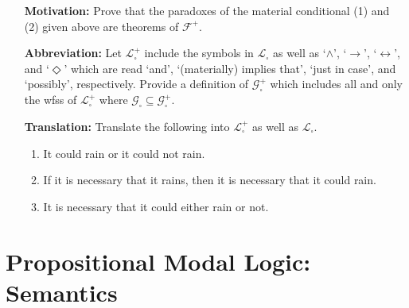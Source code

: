\documentclass[a4paper, 11pt]{article} %
\renewcommand{\L}[0]{\mathcal{L}}
\begin{document}
\begin{enumerate}[leftmargin=1.2in,labelsep=.15in] 
\item[\bf Motivation:] Prove that the paradoxes of the material conditional (1) and (2) given above are theorems of $\mathcal{F}^+$.
\item[\bf Abbreviation:] Let $\L_\square^+$ include the symbols in $\L_\square$ as well as `$\wedge$', `$\rightarrow$', `$\leftrightarrow$', and `$\Diamond$' which are read `and', `(materially) implies that', `just in case', and `possibly', respectively. Provide a definition of $\mathcal{G}_\square^+$ which includes all and only the wfss of $\L_\square^+$ where $\mathcal{G}_\square\subseteq\mathcal{G}_\square^+$.
\item[\bf Translation:] Translate the following into $\L_\square^+$ as well as $\L_\square$.
	\begin{enumerate}[label=(\arabic*)]\small
	\item It could rain or it could not rain.
	\item If it is necessary that it rains, then it is necessary that it could rain.
	\item It is necessary that it could either rain or not.
	\end{enumerate}
\end{enumerate}



\section*{\sc Propositional Modal Logic: Semantics}
\end{document}
